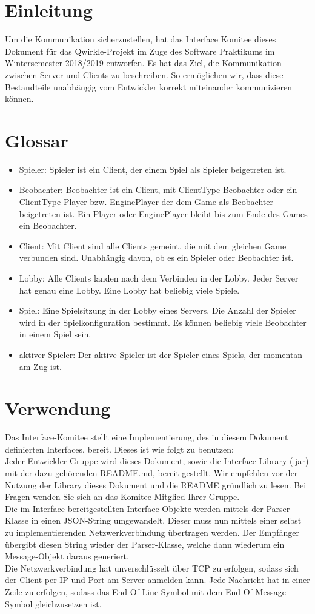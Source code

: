 \documentclass[a4paper, 10pt]{article}
\begin{document}

\tableofcontents
\newpage
\section{Einleitung}
Um die Kommunikation sicherzustellen, hat das Interface Komitee dieses Dokument für
das Qwirkle-Projekt im Zuge des Software Praktikums im Wintersemester 2018/2019 entworfen.
Es hat das Ziel, die Kommunikation zwischen Server und Clients zu beschreiben.
So ermöglichen wir, dass diese Bestandteile unabhängig vom Entwickler korrekt
miteinander kommunizieren können.
\section{Glossar}
	\begin{itemize}
	\item Spieler: Spieler ist ein Client, der einem Spiel als Spieler beigetreten ist.
	\item Beobachter: Beobachter ist ein Client, mit ClientType Beobachter oder ein ClientType Player bzw. EnginePlayer der dem Game als Beobachter beigetreten ist. Ein Player oder EnginePlayer bleibt bis zum Ende des Games ein Beobachter.
	\item Client: Mit Client sind alle Clients gemeint, die mit dem gleichen Game verbunden sind. Unabhängig davon, ob es ein Spieler oder Beobachter ist.
	\item Lobby: Alle Clients landen nach dem Verbinden in der Lobby. Jeder Server hat genau eine Lobby. Eine Lobby hat beliebig viele Spiele.
	\item Spiel: Eine Spielsitzung in der Lobby eines Servers. Die Anzahl der Spieler wird in der Spielkonfiguration bestimmt. Es können beliebig viele Beobachter in einem Spiel sein.
	\item aktiver Spieler: Der aktive Spieler ist der Spieler eines Spiels, der momentan am Zug ist.
	\end{itemize}
\section{Verwendung}
Das Interface-Komitee stellt eine Implementierung, des in diesem Dokument definierten Interfaces, bereit. Dieses ist wie folgt zu benutzen:\\
Jeder Entwickler-Gruppe wird dieses Dokument, sowie die Interface-Library (.jar) mit der dazu gehörenden README.md, bereit gestellt. Wir empfehlen vor der Nutzung der Library dieses Dokument und die README gründlich zu lesen. Bei Fragen wenden Sie sich an das Komitee-Mitglied Ihrer Gruppe.\\
Die im Interface bereitgestellten Interface-Objekte werden mittels der Parser-Klasse in einen JSON-String umgewandelt. Dieser muss nun mittels einer selbst zu implementierenden Netzwerkverbindung übertragen werden. Der Empfänger übergibt diesen String wieder der Parser-Klasse, welche dann wiederum ein Message-Objekt daraus generiert. \\
Die Netzwerkverbindung hat unverschlüsselt über TCP zu erfolgen, sodass sich der Client per IP und Port am Server anmelden kann. Jede Nachricht hat in einer Zeile zu erfolgen, sodass das End-Of-Line Symbol mit dem End-Of-Message Symbol gleichzusetzen ist.
\end{document}
